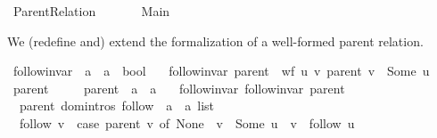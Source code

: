 %
\begin{isabellebody}%
%
%
\isadelimtheory
%
\endisadelimtheory
%
\isatagtheory
{}\isamarkupfalse%
\ Parent{\isacharunderscore}{\kern0pt}Relation\isanewline
\ \ \isanewline
\ \ \ \ Main\isanewline
{}%
\endisatagtheory
{\isafoldtheory}%
%
\isadelimtheory
%
\endisadelimtheory
%
\begin{isamarkuptext}%
We (redefine and) extend the formalization of a well-formed parent relation.%
\end{isamarkuptext}\isamarkuptrue%
\isamarkupfalse%
\ follow{\isacharunderscore}{\kern0pt}invar\ {\isacharcolon}{\kern0pt}{\isacharcolon}{\kern0pt}\ {\isachardoublequoteopen}{\isacharparenleft}{\kern0pt}{\isacharprime}{\kern0pt}a\ {\isasymrightharpoonup}\ {\isacharprime}{\kern0pt}a{\isacharparenright}{\kern0pt}\ {\isasymRightarrow}\ bool{\isachardoublequoteclose}\ \isanewline
\ \ {\isachardoublequoteopen}follow{\isacharunderscore}{\kern0pt}invar\ parent\ {\isasymequiv}\ wf\ {\isacharbraceleft}{\kern0pt}{\isacharparenleft}{\kern0pt}u{\isacharcomma}{\kern0pt}\ v{\isacharparenright}{\kern0pt}{\isachardot}{\kern0pt}\ parent\ v\ {\isacharequal}{\kern0pt}\ Some\ u{\isacharbraceright}{\kern0pt}{\isachardoublequoteclose}\isanewline
\isanewline
{}\isamarkupfalse%
\ parent\ {\isacharequal}{\kern0pt}\ \isanewline
\ \ \ parent\ {\isacharcolon}{\kern0pt}{\isacharcolon}{\kern0pt}\ {\isachardoublequoteopen}{\isacharprime}{\kern0pt}a\ {\isasymrightharpoonup}\ {\isacharprime}{\kern0pt}a{\isachardoublequoteclose}\isanewline
\ \ \ follow{\isacharunderscore}{\kern0pt}invar{\isacharcolon}{\kern0pt}\ {\isachardoublequoteopen}follow{\isacharunderscore}{\kern0pt}invar\ parent{\isachardoublequoteclose}\isanewline
\isanewline
{}\isamarkupfalse%
\ {\isacharparenleft}{\kern0pt}\ parent{\isacharparenright}{\kern0pt}\ {\isacharparenleft}{\kern0pt}domintros{\isacharparenright}{\kern0pt}\ follow\ {\isacharcolon}{\kern0pt}{\isacharcolon}{\kern0pt}\ {\isachardoublequoteopen}{\isacharprime}{\kern0pt}a\ {\isasymRightarrow}\ {\isacharprime}{\kern0pt}a\ list{\isachardoublequoteclose}\ \isanewline
\ \ {\isachardoublequoteopen}follow\ v\ {\isacharequal}{\kern0pt}\ {\isacharparenleft}{\kern0pt}case\ parent\ v\ of\ None\ {\isasymRightarrow}\ {\isacharbrackleft}{\kern0pt}v{\isacharbrackright}{\kern0pt}\ {\isacharbar}{\kern0pt}\ Some\ u\ {\isasymRightarrow}\ v\ {\isacharhash}{\kern0pt}\ follow\ u{\isacharparenright}{\kern0pt}{\isachardoublequoteclose}\isanewline

\end{isabellebody}
